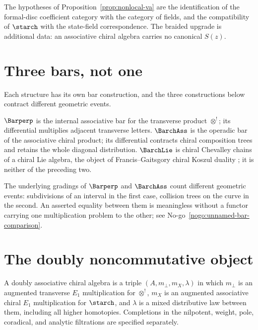 The hypotheses of Proposition~\ref{prop:nonlocal-va} are the
identification of the formal-disc coefficient category with the category
of fields, and the compatibility of $\starch$ with the state-field
correspondence. The braided upgrade is additional data: an associative
chiral algebra carries no canonical $S(z)$.

\section{Three bars, not one}

Each structure has its own bar construction, and the three constructions
below contract different geometric events.

\begin{notation}
\label{not:three-bars}
$\Barperp$ is the internal associative bar for the transverse product
$\otimes^!$; its differential multiplies adjacent transverse letters.
$\BarchAss$ is the operadic bar of the associative chiral product; its
differential contracts chiral composition trees and retains the whole
diagonal distribution. $\BarchLie$ is chiral Chevalley chains of a chiral
Lie algebra, the object of Francis--Gaitsgory chiral Koszul duality
\cite{FG12}; it is neither of the preceding two.
\end{notation}

The underlying gradings of $\Barperp$ and $\BarchAss$ count different
geometric events: subdivisions of an interval in the first case,
collision trees on the curve in the second. An asserted equality between
them is meaningless without a functor carrying one multiplication problem
to the other; see No-go~\ref{nogo:unnamed-bar-comparison}.

\section{The doubly noncommutative object}

\begin{definition}
\label{def:doubly}
A doubly associative chiral algebra is a triple $(A, m_\perp, m_X,
\lambda)$ in which $m_\perp$ is an augmented transverse $E_1$
multiplication for $\otimes^!$, $m_X$ is an augmented associative chiral
$E_1$ multiplication for $\starch$, and $\lambda$ is a mixed distributive
law between them, including all higher homotopies. Completions in the
nilpotent, weight, pole, coradical, and analytic filtrations are
specified separately.
\end{definition}

